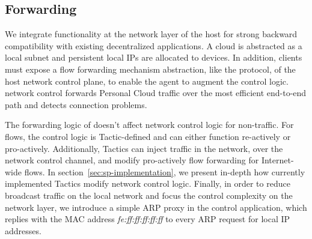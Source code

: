 

\subsection{Forwarding} \label{signpost-forwarding}

We integrate \signpost functionality at the network layer of the host for strong
backward compatibility with existing decentralized applications. A \signpost
cloud is abstracted as a local subnet and persistent local IPs are allocated to
devices. In addition, \signpost clients must expose a flow forwarding mechanism
abstraction, like the \of protocol, of the
host network control plane, to enable the \signpost agent to augment the control
logic. \signpost network control forwards Personal Cloud traffic
over the most efficient end-to-end path and detects connection problems. 

The forwarding logic of \signpost doesn't affect network control logic for
non-\signpost traffic. For \signpost flows, the control logic is Tactic-defined
and can either function re-actively or pro-actively.  Additionally, Tactics can
inject traffic in the network, over the network control channel, and modify
pro-actively flow forwarding for Internet-wide \signpost flows. In
section~\ref{sec:sp-implementation}, we present in-depth how currently implemented
\signpost Tactics modify network control logic.   Finally, in order to reduce
broadcast traffic on the \signpost local network and focus the control
complexity on the network layer, we introduce a simple ARP proxy in the control
application, which replies with the MAC address {\it fe:ff:ff:ff:ff:ff} to every
ARP request for \signpost local IP addresses. 

